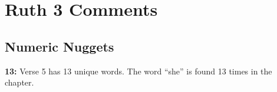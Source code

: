 \section{Ruth 3 Comments}

\subsection{Numeric Nuggets}
\textbf{13: } Verse 5 has 13 unique words. The word ``she'' is found 13 times in the chapter.